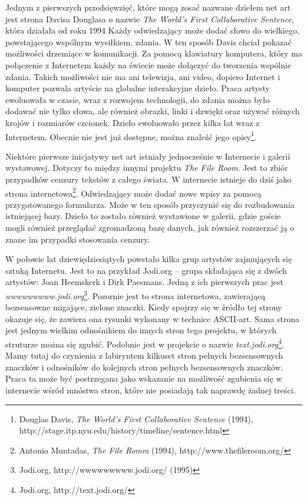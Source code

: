\documentclass[a4paper,12pt,twoside]{article}
\begin{document}
Jednym z pierwszych przedsięwzięć,
które mogą zosać nazwane dziełem net art jest strona Davisa Douglasa
o nazwie \textit{The World's First Collaborative Sentence}, która działała
od roku 1994
Każdy odwiedzający może dodać słowo do wielkiego,
powstającego wspólnym wysiłkiem, zdania. W ten sposób Davis chciał
pokazać możliwości drzemiące w komunikacji. Za pomocą klawiatury
komputera, który ma połączenie z Internetem każdy na świecie może
dołączyć do tworzenia wspólnie zdania. Takich możliwości nie ma
ani telewizja, ani video, dopiero Internet i komputer pozwala artyście
na globalne interakcyjne dzieło. Praca artysty ewoluowała w czasie,
wraz z rozwojem technologii, do zdania można było dodawać nie tylko
słowa, ale również obrazki, linki i dzwięki oraz używać różnych krojów
i rozmiarów czcionek. Dzieło ewoluowało przez kilka lat wraz z Internetem.
Obecnie nie jest już dostępne, można znaleźć jego
opisy\footnote{Douglas Davis, \textit{The World's First Collaborative
Sentence} (1994), http://stage.itp.nyu.edu/history/timeline/sentence.html}.

Niektóre pierwsze inicjatywy net art istniały jednocześnie w Internecie
i galerii wystawowej. Dotyczy to między innymi projektu
\textit{The File Room}. Jest to zbiór przypadków cenzury tekstów z całego
świata. W internecie istnieje do dziś jako strona
internetowa\footnote{Antonio Muntadas, \textit{The File Romm} (1994),
http://www.thefileroom.org/}. Odwiedzający
może dodać nowe wpisy za pomocą przygotowanego formularza. Może w ten sposób
przyczynić się do rozbudowania istniejącej bazy. Dzieło to zostało również
wystawione w galerii, gdzie goście mogli również przeglądać zgromadzoną
bazę danych, jak również rozszerzać ją o znane im przypadki stosowania
cenzury.

W połowie lat dziewiędziesiątych powstało kilka grup artystów zajmujących
się sztuką Internetu. Jest to na przykład Jodi.org -- grupa
składająca się z dwóch artystów: Joan Heemskerk i Dirk Paesmans. Jedną
z ich pierwszych prac jest
\textit{wwwwwwwww.jodi.org}\footnote{Jodi.org, http://wwwwwwwww.jodi.org/
(1995)}. Pozornie jest to strona internetowa, zawierającą bezsensowne
migające, zielone znaczki. Kiedy spojrzy się w źródło tej strony okazuje
się, że zawiera ona rysunki wykonany w technice ASCII-art. Sama strona
jest jednym wielkim odnośnikiem do innych stron tego projektu, w których
struturze można się zgubić. Podobnie jest w projekcie o nazwie
\textit{text.jodi.org}\footnote{Jodi.org, http://text.jodi.org/}. Mamy tutaj
do czynienia z labiryntem kilkuset stron pełnych bezsensownych znaczków
i odnośników do kolejnych stron pełnych bezsensownych znaczków. Praca
ta może być postrzegana jako wskazanie na możliwość zgubienia się w internecie
wśród mnóstwa stron, które nie posiadają tak naprawdę żadnej treści.
\end{document}
